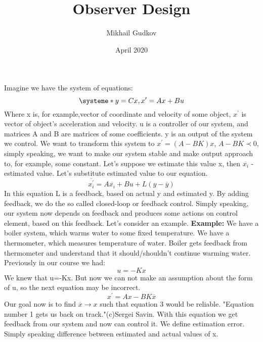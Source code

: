\documentclass{article}
\title{Observer Design}
\author{Mikhail Gudkov}
\date{April 2020}
\begin{document}
\maketitle
Imagine we have the system of equations:
\[
    \systeme*{y=C x,x^{\prime}=A x + B u }
\]
Where x is, for example,vector of coordinate and velocity of some object, $x^{\prime}$ is vector of object's acceleration and velocity. u is a controller of our system, and matrices A and B are matrices of some coefficients. y is an output of the system we control.
\newline
We want to transform this system to 
$x^\prime = ( A - B K ) x$, $ A - B K \prec 0$, simply speaking, we want to make our system stable and make output approach to, for example, some constant.
\newline
Let's suppose we estimate this value x, then
$\overline{x_{i}}$ - estimated value.
\newline
Let's substitute estimated value to our equation.
\begin{equation}
    \overline{x_{i}^\prime}=A\overline{x_{i}}+Bu+L(y-\overline{y})
\end{equation}
In this equation L is a feedback, based on actual y and estimated y.
By adding feedback, we do the so called closed-loop or feedback control. Simply speaking, our system now depends on feedback and produces some actions on control element, based on this feedback. Let's consider an example.
\newline
\textbf{Example:}
We have a boiler system, which warms water to some fixed temperature. We have a thermometer, which measures temperature of water. Boiler gets feedback from thermometer and understand that it should/shouldn't continue warming water.
\newline
Previously in our course we had:
\begin{equation}
    u=-Kx
\end{equation}
We knew that u=-Kx.
But now we can not make an assumption about the form of u, so the next equation may be incorrect.
\begin{equation}
    x^{\prime}=Ax-BK\overline{x}
\end{equation}
Our goal now is to find $\overline{x} \rightarrow x$ such that equation 3 would be reliable.
"Equation number 1 gets us back on track."(c)Sergei Savin.
With this equation we get feedback from our system and now can control it.
\newline
We define estimation error. Simply speaking difference between estimated and actual values of x.
\end{document}

